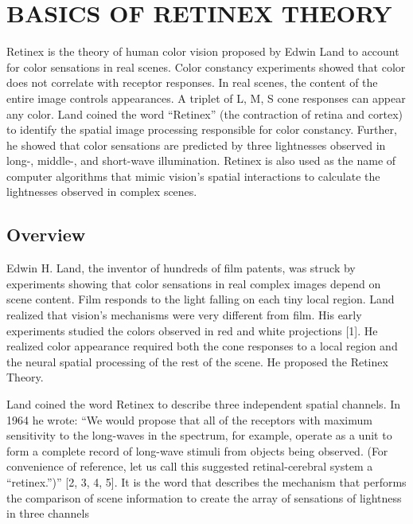 \section{BASICS OF RETINEX THEORY}
Retinex is the theory of human color vision proposed by Edwin Land to account for color sensations in real scenes. Color constancy experiments showed that color does not correlate with receptor responses. In real scenes, the content of the entire image controls appearances. A triplet of L, M, S cone responses can appear any color. Land coined the word “Retinex” (the contraction of retina and cortex) to identify the spatial image processing responsible for color constancy. Further, he showed that color sensations are predicted by three lightnesses observed in long-, middle-, and short-wave illumination. Retinex is also used as the name of computer algorithms that mimic vision’s spatial interactions to calculate the lightnesses observed in complex scenes.

\subsection{Overview}
Edwin H. Land, the inventor of hundreds of film patents, was struck by experiments showing that color sensations in real complex images depend on scene content. Film responds to the light falling on each tiny local region. Land realized that vision’s mechanisms were very different from film. His early experiments studied the colors observed in red and white projections [1]. He realized color appearance required both the cone responses to a local region and the neural spatial processing of the rest of the scene. He proposed the Retinex Theory.

Land coined the word Retinex to describe three independent spatial channels. In 1964 he wrote: “We would propose that all of the receptors with maximum sensitivity to the long-waves in the spectrum, for example, operate as a unit to form a complete record of long-wave stimuli from objects being observed. (For convenience of reference, let us call this suggested retinal-cerebral system a “retinex.”)” [2, 3, 4, 5]. It is the word that describes the mechanism that performs the comparison of scene information to create the array of sensations of lightness in three channels


